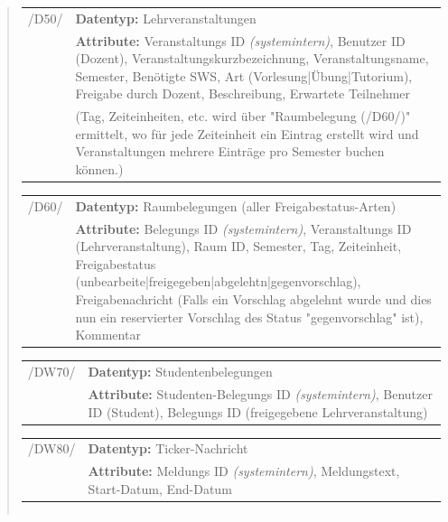 \begin{quote}
\begin{tabular}{p{1.5cm}p{14.5cm}}
	 /D50/	& \textbf{Datentyp:} Lehrveranstaltungen \\
				& \textbf{Attribute:} Veranstaltungs ID \textsl{(systemintern)}, Benutzer ID (Dozent), Veranstaltungskurzbezeichnung, Veranstaltungsname, Semester, Benötigte SWS, Art (Vorlesung|Übung|Tutorium), Freigabe durch Dozent, Beschreibung, Erwartete Teilnehmer\\ 
				&(Tag, Zeiteinheiten, etc. wird über "Raumbelegung (/D60/)" ermittelt, wo für jede Zeiteinheit ein Eintrag erstellt wird und Veranstaltungen mehrere Einträge pro Semester buchen können.) \\[0.25cm]

\end{tabular}


\begin{tabular}{p{1.5cm}p{14.5cm}}
					
	 /D60/	& \textbf{Datentyp:} Raumbelegungen (aller Freigabestatus-Arten) \\
				& \textbf{Attribute:} Belegungs ID \textsl{(systemintern)}, Veranstaltungs ID (Lehrveranstaltung), Raum ID, Semester, Tag, Zeiteinheit, Freigabestatus (unbearbeite|freigegeben|abgelehtn|gegenvorschlag), Freigabenachricht (Falls ein Vorschlag abgelehnt wurde und dies nun ein reservierter Vorschlag des Status "gegenvorschlag" ist), Kommentar  \\[0.25cm]

\end{tabular}


\begin{tabular}{p{1.5cm}p{14.5cm}}
		
	 /DW70/& \textbf{Datentyp:} Studentenbelegungen \\
				& \textbf{Attribute:} Studenten-Belegungs ID \textsl{(systemintern)}, Benutzer ID (Student), Belegungs ID (freigegebene Lehrveranstaltung) \\[0.25cm]

\end{tabular}


\begin{tabular}{p{1.5cm}p{14.5cm}}
					
	 /DW80/& \textbf{Datentyp:} Ticker-Nachricht \\
				& \textbf{Attribute:} Meldungs ID \textsl{(systemintern)}, Meldungstext, Start-Datum, End-Datum \\[0.25cm]
		
\end{tabular}

\begin{tabular}{p{1.5cm}p{14.5cm}}
					

\end{tabular}
\end{quote}
